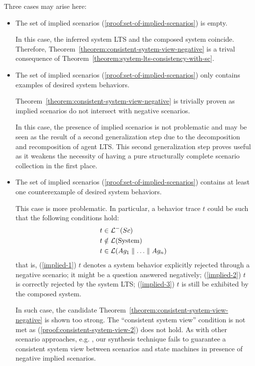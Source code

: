 Three cases may arise here:
\begin{itemize}
\item The set of implied scenarios (\ref{proof:set-of-implied-scenarios}) is empty. 

In this case, the inferred system LTS and the composed system coincide. Therefore, Theorem~\ref{theorem:consistent-system-view-negative} is a trival consequence of Theorem~\ref{theorem:system-lts-consistency-with-sc}.

\item The set of implied scenarios (\ref{proof:set-of-implied-scenarios}) only contains examples of desired system behaviors.

Theorem~\ref{theorem:consistent-system-view-negative} is trivially proven as implied scenarios do not intersect with negative scenarios. 

In this case, the presence of implied scenarios is not problematic and may be seen as the result of a second generalization step due to the decomposition and recomposition of agent LTS. This second generalization step proves useful as it weakens the necessity of having a pure structurally complete scenario collection in the first place.

\item The set of implied scenarios (\ref{proof:set-of-implied-scenarios}) contains at least one counterexample of desired system behaviors. 

This case is more problematic. In particular, a behavior trace $t$ could be such that the following conditions hold:
\begin{align}
&t \in \mathcal{L}^-(Sc)\label{implied-1}\\
&t \notin \mathcal{L}(\mbox{System})\label{implied-2}\\
&t \in \mathcal{L}(Ag_1 \parallel \ldots \parallel Ag_n)\label{implied-3}
\end{align}
that is, (\ref{implied-1}) $t$ denotes a system behavior explicitly rejected through a negative scenario; it might be a question answered negatively; (\ref{implied-2}) $t$ is correctly rejected by the system LTS; (\ref{implied-3}) $t$ is still be exhibited by the composed system.

In such case, the candidate Theorem~\ref{theorem:consistent-system-view-negative} is shown too strong.  The ``consistent system view'' condition is not met as (\ref{proof:consistent-system-view-2}) does not hold. As with other scenario approaches, e.g. \cite{Alur:2000, Uchitel:2004}, our synthesis technique fails to guarantee a consistent system view between scenarios and state machines in presence of negative implied scenarios.


\end{itemize}
